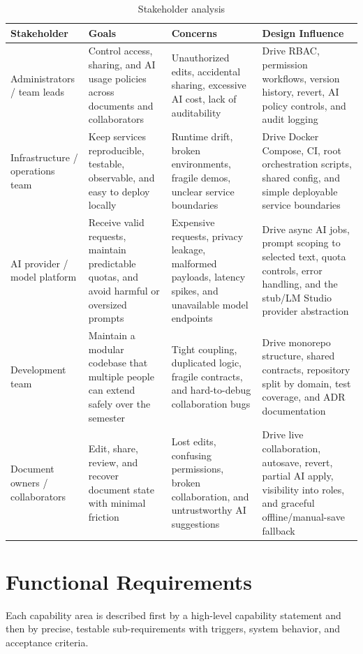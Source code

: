 \begin{table}[H]
\centering
\caption{Stakeholder analysis}
\label{tab:stakeholders}
\begin{tabularx}{\textwidth}{p{2.5cm}X X X}
\toprule
\textbf{Stakeholder} & \textbf{Goals} & \textbf{Concerns} & \textbf{Design Influence} \\
\midrule
Administrators / team leads & Control access, sharing, and AI usage policies across documents and collaborators & Unauthorized edits, accidental sharing, excessive AI cost, lack of auditability & Drive RBAC, permission workflows, version history, revert, AI policy controls, and audit logging \\
Infrastructure / operations team & Keep services reproducible, testable, observable, and easy to deploy locally & Runtime drift, broken environments, fragile demos, unclear service boundaries & Drive Docker Compose, CI, root orchestration scripts, shared config, and simple deployable service boundaries \\
AI provider / model platform & Receive valid requests, maintain predictable quotas, and avoid harmful or oversized prompts & Expensive requests, privacy leakage, malformed payloads, latency spikes, and unavailable model endpoints & Drive async AI jobs, prompt scoping to selected text, quota controls, error handling, and the stub/LM Studio provider abstraction \\
Development team & Maintain a modular codebase that multiple people can extend safely over the semester & Tight coupling, duplicated logic, fragile contracts, and hard-to-debug collaboration bugs & Drive monorepo structure, shared contracts, repository split by domain, test coverage, and ADR documentation \\
Document owners / collaborators & Edit, share, review, and recover document state with minimal friction & Lost edits, confusing permissions, broken collaboration, and untrustworthy AI suggestions & Drive live collaboration, autosave, revert, partial AI apply, visibility into roles, and graceful offline/manual-save fallback \\
\bottomrule
\end{tabularx}
\end{table}

\section{Functional Requirements}

Each capability area is described first by a high-level capability statement and then by precise,
testable sub-requirements with triggers, system behavior, and acceptance criteria.


